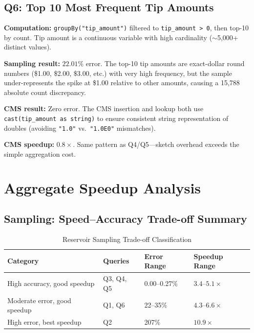 \documentclass{article}
\begin{document}
\subsection{Q6: Top 10 Most Frequent Tip Amounts}

\textbf{Computation:} \texttt{groupBy("tip\_amount")} filtered to \texttt{tip\_amount > 0}, then top-10 by count. Tip amount is a continuous variable with high cardinality ($\sim$5{,}000+ distinct values).

\textbf{Sampling result:} $22.01\%$ error. The top-10 tip amounts are exact-dollar round numbers (\$1.00, \$2.00, \$3.00, etc.) with very high frequency, but the sample under-represents the spike at \$1.00 relative to other amounts, causing a 15{,}788 absolute count discrepancy.

\textbf{CMS result:} Zero error. The CMS insertion and lookup both use \texttt{cast(tip\_amount as string)} to ensure consistent string representation of doubles (avoiding \texttt{"1.0"} vs.\ \texttt{"1.0E0"} mismatches).

\textbf{CMS speedup:} $0.8\times$. Same pattern as Q4/Q5—sketch overhead exceeds the simple aggregation cost.



\section{Aggregate Speedup Analysis}

\subsection{Sampling: Speed--Accuracy Trade-off Summary}

\begin{table}[H]
\centering
\caption{Reservoir Sampling Trade-off Classification}
\label{tab:sampling_tradeoff}
\begin{tabular}{l l l l}
\toprule
\textbf{Category} & \textbf{Queries} & \textbf{Error Range} & \textbf{Speedup Range} \\
\midrule
High accuracy, good speedup    & Q3, Q4, Q5 & 0.00--0.27\% & $3.4$--$5.1\times$ \\
Moderate error, good speedup   & Q1, Q6     & 22--35\%     & $4.3$--$6.6\times$ \\
High error, best speedup       & Q2         & 207\%        & $10.9\times$ \\
\bottomrule
\end{tabular}
\end{table}
\end{document}
